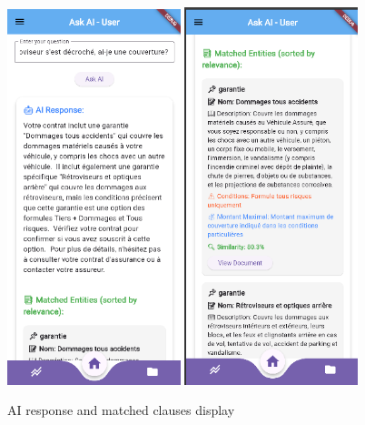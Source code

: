 \newpage

\begin{figure}[H]
    \centering
    \includegraphics[width=0.45\textwidth]{frontend/usecase_2.png}
    \hspace{0.05\textwidth}
    \includegraphics[width=0.45\textwidth]{frontend/usecase_2_photo2.png}
    \caption{AI response and matched clauses display}
\end{figure}


